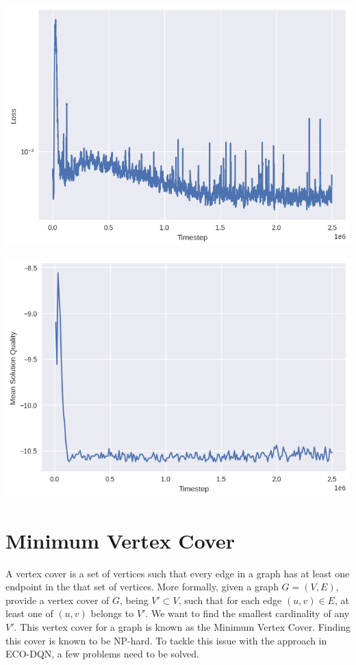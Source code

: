 \documentclass{article}
\begin{document}
\includegraphics[scale=0.5]{../ER_20spin/eco/min_cut/network/loss.png}

\includegraphics[scale=0.5]{../ER_20spin/eco/min_cut/network/training_curve.png}

\section{Minimum Vertex Cover}

A vertex cover is a set of vertices such that every edge in a graph has at least one endpoint in the that set of vertices. More formally, given a graph $G = (V, E)$, provide a vertex cover of $G$, being $V' \subset V$, such that for each edge $(u, v) \in E$, at least one of $(u, v)$ belongs to $V'$. We want to find the smallest cardinality of any $V'$. This vertex cover for a graph is known as the Minimum Vertex Cover. Finding this cover is known to be NP-hard. To tackle this issue with the approach in ECO-DQN, a few problems need to be solved.
\end{document}
